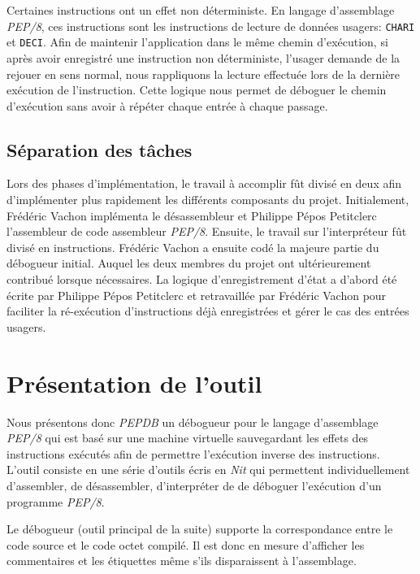 \documentclass{article}
\begin{document}
Certaines instructions ont un effet non déterministe. En langage
d'assemblage \emph{PEP/8}, ces instructions sont les instructions de
lecture de données usagers: \texttt{CHARI} et \texttt{DECI}. Afin de
maintenir l'application dans le même chemin d'exécution, si après avoir
enregistré une instruction non déterministe, l'usager demande de la
rejouer en sens normal, nous rappliquons la lecture effectuée lors de la
dernière exécution de l'instruction. Cette logique nous permet de
déboguer le chemin d'exécution sans avoir à répéter chaque entrée à
chaque passage.

\subsection{Séparation des tâches}\label{suxe9paration-des-tuxe2ches}

Lors des phases d'implémentation, le travail à accomplir fût divisé en
deux afin d'implémenter plus rapidement les différents composants du
projet. Initialement, Frédéric Vachon implémenta le désassembleur et
Philippe Pépos Petitclerc l'assembleur de code assembleur \emph{PEP/8}.
Ensuite, le travail sur l'interpréteur fût divisé en instructions.
Frédéric Vachon a ensuite codé la majeure partie du débogueur initial.
Auquel les deux membres du projet ont ultérieurement contribué lorsque
nécessaires. La logique d'enregistrement d'état a d'abord été écrite par
Philippe Pépos Petitclerc et retravaillée par Frédéric Vachon pour
faciliter la ré-exécution d'instructions déjà enregistrées et gérer le
cas des entrées usagers.

\section{Présentation de l'outil}\label{pruxe9sentation-de-loutil}

Nous présentons donc \emph{PEPDB} un débogueur pour le langage
d'assemblage \emph{PEP/8} qui est basé sur une machine virtuelle
sauvegardant les effets des instructions exécutés afin de permettre
l'exécution inverse des instructions. L'outil consiste en une série
d'outils écris en \emph{Nit} qui permettent individuellement
d'assembler, de désassembler, d'interpréter de de déboguer l'exécution
d'un programme \emph{PEP/8}.

Le débogueur (outil principal de la suite) supporte la correspondance
entre le code source et le code octet compilé. Il est donc en mesure
d'afficher les commentaires et les étiquettes même s'ils disparaissent à
l'assemblage.
\end{document}
